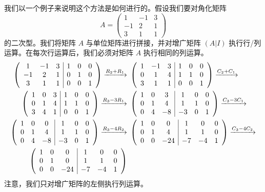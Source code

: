 我们以一个例子来说明这个方法是如何进行的。假设我们要对角化矩阵
$$A = \begin{pmatrix} 1 & -1 & 3 \\ -1 & 2 & 1 \\ 3 & 1 & 1 \end{pmatrix}$$
的二次型。我们将矩阵 $A$ 与单位矩阵进行拼接，并对增广矩阵 $(A | I)$ 执行行/列运算。在每次行运算后，我们必须对矩阵 $A$ 执行相同的列运算。
\begin{equation} \notag
\begin{split}
\left(\begin{array}{ccc|ccc} 1 & -1 & 3 & 1 & 0 & 0 \\ -1 & 2 & 1 & 0 & 1 & 0 \\ 3 & 1 & 1 & 0 & 0 & 1 \end{array}\right) \xrightarrow{R_2+R_1}
&\ \left(\begin{array}{ccc|ccc} 1 & -1 & 3 & 1 & 0 & 0 \\ 0 & 1 & 4 & 1 & 1 & 0 \\ 3 & 1 & 1 & 0 & 0 & 1 \end{array}\right) \xrightarrow{C_2+C_1} \\
\left(\begin{array}{ccc|ccc} 1 & 0 & 3 & 1 & 0 & 0 \\ 0 & 1 & 4 & 1 & 1 & 0 \\ 3 & 4 & 1 & 0 & 0 & 1 \end{array}\right) \xrightarrow{R_3-3R_1}
&\ \left(\begin{array}{ccc|ccc} 1 & 0 & 3 & 1 & 0 & 0 \\ 0 & 1 & 4 & 1 & 1 & 0 \\ 0 & 4 & -8 & -3 & 0 & 1 \end{array}\right) \xrightarrow{C_3-3C_1}\\
\left(\begin{array}{ccc|ccc} 1 & 0 & 0 & 1 & 0 & 0 \\ 0 & 1 & 4 & 1 & 1 & 0 \\ 0 & 4 & -8 & -3 & 0 & 1 \end{array}\right) \xrightarrow{R_3-4R_2}
&\ \left(\begin{array}{ccc|ccc} 1 & 0 & 0 & 1 & 0 & 0 \\ 0 & 1 & 4 & 1 & 1 & 0 \\ 0 & 0 & -24 & -7 & -4 & 1 \end{array} \right)\xrightarrow{C_3-4C_2}\\
\left(\begin{array}{ccc|ccc} 1 & 0 & 0 & 1 & 0 & 0 \\ 0 & 1 & 0 & 1 & 1 & 0 \\ 0 & 0 & -24 & -7 & -4 & 1 \end{array}\right)
\end{split}\end{equation}
注意，我们只对增广矩阵的左侧执行列运算。

